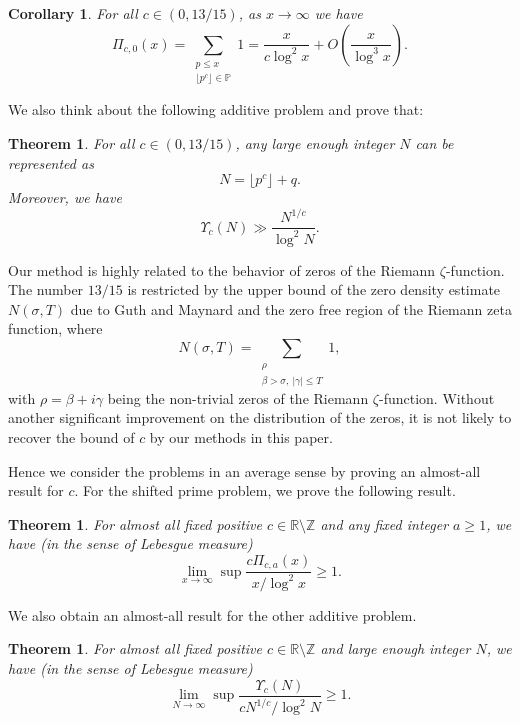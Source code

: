 \documentclass[12pt, reqno, twoside, letterpaper]{amsart}
\numberwithin{equation}{section}
\newcommand{\PP}{\ensuremath{\mathbb{P}}}
\newcommand{\RR}{\ensuremath{\mathbb{R}}}
\newcommand{\ZZ}{\ensuremath{\mathbb{Z}}}
\theoremstyle{customthm}
\newtheorem{theorem}[Y]{Theorem}
\newtheorem{corollary}[Z]{Corollary}
\theoremstyle{customrem}
\begin{document}
\begin{corollary}  For all $c \in (0, 13/15)$, as $x\rightarrow \infty$ we have
	\label{corollary:1}
	$$
	\Pi_{c,0}(x)=\sum_{\substack{p\leqslant x \\ \lfloor p^c \rfloor \in \PP}}1 = \frac{x}{c\log ^2 x}+ O(\frac{x}{\log ^3x}).
	$$
\end{corollary}

We also think about the following additive problem and prove that: 

\begin{theorem} For all $c \in (0, 13/15)$, any large enough integer $N$ can be represented as
	$$
	N=\lfloor p^c\rfloor+q.
	$$
	Moreover, we have
	\label{thm:main_2}
	$$
	\Upsilon_c(N)\gg \frac{N^{1/c}}{\log ^2N}.
	$$
\end{theorem}

Our method is highly related to the behavior of zeros of the Riemann $\zeta$-function. The number $13/15$ is restricted by the upper bound of the zero density estimate $N(\sigma,T)$ due to Guth and Maynard \cite{Maynard} and the zero free region of the Riemann zeta function, where
$$
N(\sigma,T)=\sum_{\substack{\rho\\ \beta>\sigma,\ |\gamma|\leqslant T}}1,
$$
with $\rho =\beta +i\gamma$ being the non-trivial zeros of the Riemann $\zeta$-function. Without another significant improvement on the distribution of the zeros, it is not likely to recover the bound of $c$ by our methods in this paper. 

Hence we consider the problems in an average sense by proving an almost-all result for $c$. For the shifted prime problem, we prove the following result.

\begin{theorem}
	\label{thm:main_3}
 For almost all fixed positive $c \in \RR\setminus\ZZ$ and any fixed integer $a\geqslant 1$, we have (in the sense of Lebesgue measure)
	$$
	\lim\limits_{x\rightarrow\infty}\sup \frac{c \Pi_{c,a}(x)}{x/\log ^2 x}\geqslant 1.
	$$
\end{theorem}

We also obtain an almost-all result for the other additive problem. 

\begin{theorem}	
\label{thm:main_4}
For almost all fixed positive $c \in \RR\setminus\ZZ$ and large enough integer $N$, we have (in the sense of Lebesgue measure)
	$$
	\lim\limits_{N\rightarrow\infty}\sup \frac{\Upsilon_c(N)}{cN^{1/c}/\log ^2 N}\geqslant 1.
	$$
\end{theorem}
\end{document}
